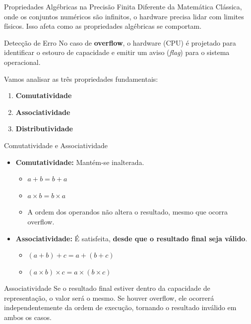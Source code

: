 \begin{frame}{Propriedades Algébricas na Precisão Finita}
    Diferente da Matemática Clássica, onde os conjuntos numéricos são infinitos, o hardware precisa lidar com limites físicos. Isso afeta como as propriedades algébricas se comportam.

    \begin{block}{Detecção de Erro}
        No caso de \textbf{overflow}, o hardware (CPU) é projetado para identificar o estouro de capacidade e emitir um aviso (\textit{flag}) para o sistema operacional.
    \end{block}

    \vspace{0.4cm}
    Vamos analisar as três propriedades fundamentais:
    \begin{enumerate}
        \item \textbf{Comutatividade}
        \item \textbf{Associatividade}
        \item \textbf{Distributividade}
    \end{enumerate}
\end{frame}

\begin{frame}{Comutatividade e Associatividade}
    \begin{itemize}
        \item \textbf{Comutatividade:} Mantém-se inalterada.
              \begin{itemize}
                  \item $a + b = b + a$
                  \item $a \times b = b \times a$
                  \item A ordem dos operandos não altera o resultado, mesmo que ocorra overflow.
              \end{itemize}

              \vspace{0.3cm}

        \item \textbf{Associatividade:} É satisfeita, \textbf{desde que o resultado final seja válido}.
              \begin{itemize}
                  \item $(a + b) + c = a + (b + c)$
                  \item $(a \times b) \times c = a \times (b \times c)$
              \end{itemize}
    \end{itemize}

    \begin{alertblock}{Associatividade}
        Se o resultado final estiver dentro da capacidade de representação, o valor será o mesmo. Se houver overflow, ele ocorrerá independentemente da ordem de execução, tornando o resultado inválido em ambos os casos.
    \end{alertblock}
\end{frame}


